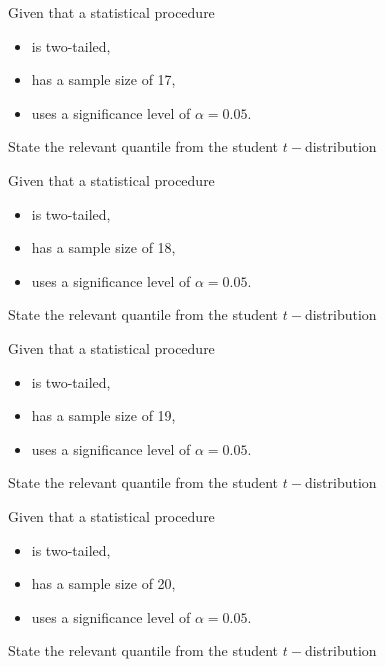 \documentclass[12pt, a4paper]{report}
\theoremstyle{definition}
\theoremstyle{remark}
\begin{document}

	
	
	
	Given that a statistical procedure 
	\begin{itemize}
		\item is two-tailed,
		\item has a sample size of 17,
		\item uses a significance level of $\alpha = 0.05$.
	\end{itemize} \smallskip
	State the relevant quantile from the student $t-$distribution
	


	
	
	
	Given that a statistical procedure
	\begin{itemize}
		\item is two-tailed,
		\item has a sample size of 18,
		\item uses a significance level of $\alpha = 0.05$.
	\end{itemize} \smallskip
	State the relevant quantile from the student $t-$distribution
	


	
	
	
	Given that a statistical procedure 
	\begin{itemize}
		\item is two-tailed,
		\item has a sample size of 19,
		\item uses a significance level of $\alpha = 0.05$.
	\end{itemize} \smallskip
	State the relevant quantile from the student $t-$distribution
	


	
	
	
	Given that a statistical procedure 
	\begin{itemize}
		\item is two-tailed,
		\item has a sample size of 20,
		\item uses a significance level of $\alpha = 0.05$.
	\end{itemize} \smallskip
	State the relevant quantile from the student $t-$distribution
	

\end{document}
